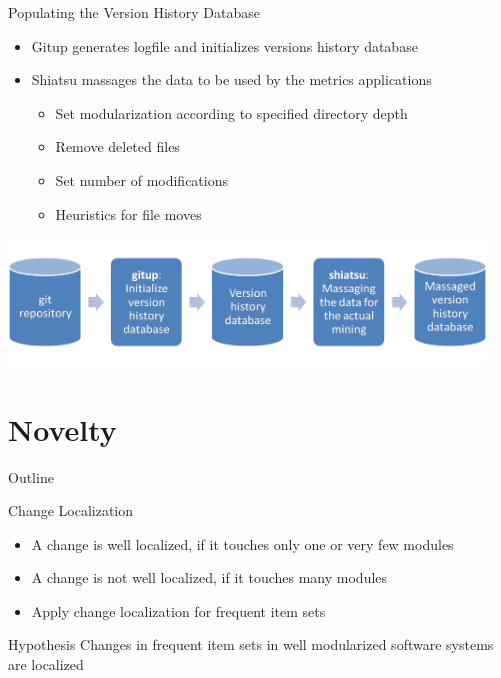 \begin{frame}{Populating the Version History Database}
  \begin{itemize}
  \item Gitup generates logfile and initializes versions history
    database
  \item Shiatsu massages the data to be used by the metrics
    applications
    \begin{itemize}
    \item Set modularization according to specified directory depth
    \item Remove deleted files
    \item Set number of modifications
    \item Heuristics for file moves
    \end{itemize}
  \end{itemize}


  \begin{center}
    \includegraphics[width=0.95\textwidth]{figures/initialize-database}
  \end{center}
\end{frame}

\note{
}


\section{Novelty}

\begin{frame}{Outline}
  \tableofcontents[current]
\end{frame}

\note{
}

\begin{frame}{Change Localization}
  \begin{itemize}
  \item A change is well localized, if it touches only one or very few
    modules
  \item A change is not well localized, if it touches many modules
  \item Apply change localization for frequent item sets
  \end{itemize}


  \begin{block}{Hypothesis}
    Changes in frequent item sets in well modularized software systems
    are localized
  \end{block}
\end{frame}


